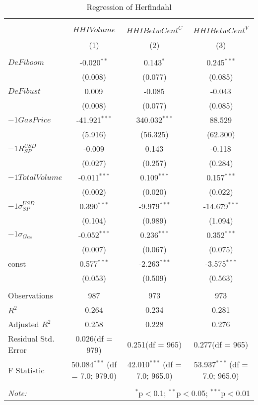 \begin{table}[!htbp] \centering
  \caption{Regression of Herfindahl}
\begin{tabular}{@{\extracolsep{5pt}}lccc}
\\[-1.8ex]\hline
\hline \\[-1.8ex]
\\[-1.8ex] & \multicolumn{1}{c}{${	 HHIVolume}$} & \multicolumn{1}{c}{${	 HHIBetwCent}^C$} & \multicolumn{1}{c}{${	 HHIBetwCent}^V$}  \\
\\[-1.8ex] & (1) & (2) & (3) \\
\hline \\[-1.8ex]
 ${	 DeFiboom}$ & -0.020$^{**}$ & 0.143$^{*}$ & 0.245$^{***}$ \\
  & (0.008) & (0.077) & (0.085) \\
 ${	 DeFibust}$ & 0.009$^{}$ & -0.085$^{}$ & -0.043$^{}$ \\
  & (0.008) & (0.077) & (0.085) \\
 ${	-1 GasPrice}$ & -41.921$^{***}$ & 340.032$^{***}$ & 88.529$^{}$ \\
  & (5.916) & (56.325) & (62.300) \\
 ${	-1 R}^{USD}_{SP}$ & -0.009$^{}$ & 0.143$^{}$ & -0.118$^{}$ \\
  & (0.027) & (0.257) & (0.284) \\
 ${	-1 TotalVolume}$ & -0.011$^{***}$ & 0.109$^{***}$ & 0.157$^{***}$ \\
  & (0.002) & (0.020) & (0.022) \\
 ${	-1 \sigma}^{USD}_{SP}$ & 0.390$^{***}$ & -9.979$^{***}$ & -14.679$^{***}$ \\
  & (0.104) & (0.989) & (1.094) \\
 ${	-1 \sigma}_{Gas}$ & -0.052$^{***}$ & 0.236$^{***}$ & 0.352$^{***}$ \\
  & (0.007) & (0.067) & (0.075) \\
 const & 0.577$^{***}$ & -2.263$^{***}$ & -3.575$^{***}$ \\
  & (0.053) & (0.509) & (0.563) \\
\hline \\[-1.8ex]
 Observations & 987 & 973 & 973 \\
 $R^2$ & 0.264 & 0.234 & 0.281 \\
 Adjusted $R^2$ & 0.258 & 0.228 & 0.276 \\
 Residual Std. Error & 0.026(df = 979) & 0.251(df = 965) & 0.277(df = 965)  \\
 F Statistic & 50.084$^{***}$ (df = 7.0; 979.0) & 42.010$^{***}$ (df = 7.0; 965.0) & 53.937$^{***}$ (df = 7.0; 965.0) \\
\hline
\hline \\[-1.8ex]
\textit{Note:} & \multicolumn{3}{r}{$^{*}$p$<$0.1; $^{**}$p$<$0.05; $^{***}$p$<$0.01} \\
\end{tabular}
\end{table}